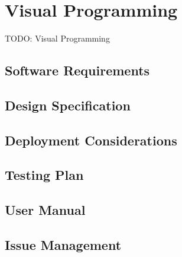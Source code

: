 \section{Visual Programming}

TODO: Visual Programming

\subsection{Software Requirements}

\subsection{Design Specification}

\subsection{Deployment Considerations}

\subsection{Testing Plan}

\subsection{User Manual}

\subsection{Issue Management}
